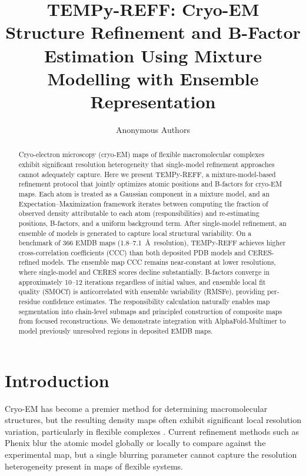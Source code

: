 \documentclass[11pt]{article}
\title{TEMPy-REFF: Cryo-EM Structure Refinement and B-Factor Estimation Using Mixture Modelling with Ensemble Representation}
\author{Anonymous Authors}
\date{}
\begin{document}
\maketitle

\begin{abstract}
Cryo-electron microscopy (cryo-EM) maps of flexible macromolecular complexes exhibit significant resolution heterogeneity that single-model refinement approaches cannot adequately capture. Here we present TEMPy-REFF, a mixture-model-based refinement protocol that jointly optimizes atomic positions and B-factors for cryo-EM maps. Each atom is treated as a Gaussian component in a mixture model, and an Expectation--Maximization framework iterates between computing the fraction of observed density attributable to each atom (responsibilities) and re-estimating positions, B-factors, and a uniform background term. After single-model refinement, an ensemble of models is generated to capture local structural variability. On a benchmark of 366 EMDB maps (1.8--7.1~\AA\ resolution), TEMPy-REFF achieves higher cross-correlation coefficients (CCC) than both deposited PDB models and CERES-refined models. The ensemble map CCC remains near-constant at lower resolutions, where single-model and CERES scores decline substantially. B-factors converge in approximately 10--12 iterations regardless of initial values, and ensemble local fit quality (SMOCf) is anticorrelated with ensemble variability (RMSFe), providing per-residue confidence estimates. The responsibility calculation naturally enables map segmentation into chain-level submaps and principled construction of composite maps from focused reconstructions. We demonstrate integration with AlphaFold-Multimer to model previously unresolved regions in deposited EMDB maps.
\end{abstract}

\section{Introduction}

Cryo-EM has become a premier method for determining macromolecular structures, but the resulting density maps often exhibit significant local resolution variation, particularly in flexible complexes \citep{brown2015tools}. Current refinement methods such as Phenix \citep{afonine2018real} blur the atomic model globally or locally to compare against the experimental map, but a single blurring parameter cannot capture the resolution heterogeneity present in maps of flexible systems.
\end{document}
